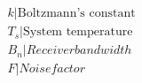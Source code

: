 \documentclass[preview]{standalone}
\begin{document}
\begin{align*}
&k | \text{Boltzmann's constant} \\ &T_s | \text{System temperature} \\ &B_n | Receiver bandwidth \\ &F | Noise factor
\end{align*}
\end{document}
